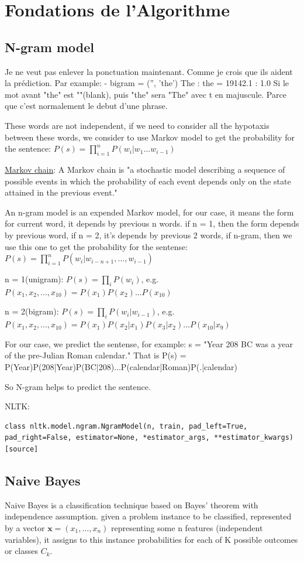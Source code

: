 \documentclass[a4paper]{article}
\begin{document}
{\section{Fondations de l’Algorithme}
\subsection{N-gram model}
Je ne veut pas enlever la ponctuation maintenant. Comme je crois que ils aident la prédiction.  Par example:
- bigram = ('', 'the')       The : the    =  19142.1 : 1.0
Si le mot avant "the" est ""(blank), puis "the" sera "The" avec t en majuscule. Parce que c'est normalement le debut d'une phrase.

These words are not independent, if we need to consider all the hypotaxis between these words, we consider to use Markov model to get the probability for the sentence: $P(s)=\prod\limits_{i=1}^{n}P(w_i|w_1...w_{i-1})$

\href{https://en.wikipedia.org/wiki/Markov_chain}{Markov chain}: A Markov chain is "a stochastic model describing a sequence of possible events in which the probability of each event depends only on the state attained in the previous event."

An n-gram model is an expended Markov model, for our case, it means the form for current word, it depends by previous n words. if n = 1, then the form depends by previous word, if n = 2, it's depends by previous 2 words, if n-gram, then we use this one to get the probability for the sentense: $P(s)=\prod\limits_{i=1}^{n}P(w_i|w_{i-n+1},...,w_{i-1})$

n = 1(unigram): $P(s)=\prod\limits_{i}P(w_i)$, e.g. $P(x_1,x_2,...,x_{10}) = P(x_1)P(x_2)...P(x_{10})$

n = 2(bigram): $P(s)=\prod\limits_{i}P(w_i|w_{i-1})$, e.g. $P(x_1,x_2,...,x_{10}) = P(x_1)P(x_2|x_1)P(x_3|x_2)...P(x_{10}|x_9)$

For our case, we predict the sentense, for example: 
s = "Year 208 BC was a year of the pre-Julian Roman calendar." 
That is P(s) = P(Year)P(208|Year)P(BC|208)...P(calendar|Roman)P(.|calendar)

So N-gram helps to predict the sentence.

NLTK:
\begin{lstlisting}
class nltk.model.ngram.NgramModel(n, train, pad_left=True, pad_right=False, estimator=None, *estimator_args, **estimator_kwargs)[source]
\end{lstlisting}

\subsection{Naive Bayes}
Naive Bayes is a classification technique based on Bayes' theorem with independence assumption.  given a problem instance to be classified, represented by a vector ${\mathbf  {x}}=(x_{1},\dots ,x_{n})$ representing some n features (independent variables), it assigns to this instance probabilities for each of K possible outcomes or classes $C_{k}$. \cite{murty_pattern_2011}

}
\end{document}
